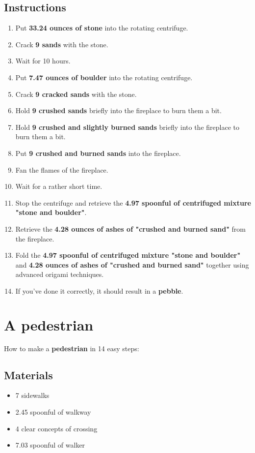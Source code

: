 \documentclass{article}
\begin{document}
\subsection{Instructions}\begin{enumerate}
\item 
Put \textbf{33.24 ounces of stone} into the rotating centrifuge.
\item 
Crack \textbf{9 sands} with the stone.
\item 
Wait for 10 hours.
\item 
Put \textbf{7.47 ounces of boulder} into the rotating centrifuge.
\item 
Crack \textbf{9 cracked sands} with the stone.
\item 
Hold \textbf{9 crushed sands} briefly into the fireplace to burn them a bit.
\item 
Hold \textbf{9 crushed and slightly burned sands} briefly into the fireplace to burn them a bit.
\item 
Put \textbf{9 crushed and burned sands} into the fireplace.
\item 
Fan the flames of the fireplace.
\item 
Wait for a rather short time.
\item 
Stop the centrifuge and retrieve the \textbf{4.97 spoonful of centrifuged mixture "stone and boulder"}.
\item 
Retrieve the \textbf{4.28 ounces of ashes of "crushed and burned sand"} from the fireplace.
\item 
Fold the \textbf{4.97 spoonful of centrifuged mixture "stone and boulder"} and \textbf{4.28 ounces of ashes of "crushed and burned sand"} together using advanced origami techniques.
\item 
If you've done it correctly, it should result in a \textbf{pebble}.
\end{enumerate}
\newpage
\section{A pedestrian}How to make a \textbf{pedestrian} in 14 easy steps:

\subsection{Materials}\begin{itemize}
\item 
7 sidewalks
\item 
2.45 spoonful of walkway
\item 
4 clear concepts of crossing
\item 
7.03 spoonful of walker
\end{itemize}
\end{document}
